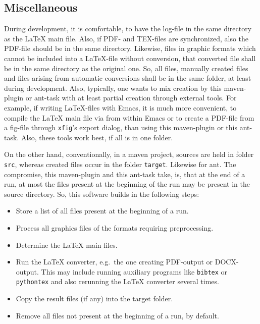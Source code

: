 \subsection{Miscellaneous}



During development, it is comfortable, 
to have the log-file in the same directory as the \LaTeX{} main file. 
Also, if PDF- and TEX-files are synchronized, 
also the PDF-file should be in the same directory. 
Likewise, files in graphic formats 
which cannot be included into a \LaTeX-file without conversion, 
that converted file shall be in the same directory as the original one. 
So, all files, manually created files 
and files arising from automatic conversions 
shall be in the same folder, at least during development. 
Also, typically, one wants to mix creation by this maven-plugin or ant-task 
with at least partial creation through external tools. 
For example, if writing \LaTeX-files with Emacs, 
it is much more convenient, to compile the \LaTeX{} main file 
via \pdflatex{} from within Emacs 
or to create a PDF-file from a \gls{fig}-file 
through \texttt{xfig}'s export dialog, 
than using this maven-plugin or this ant-task. 
Also, these tools work best, if all is in one folder. 

On the other hand, 
conventionally, in a maven project, 
sources are held in folder \texttt{src}, 
whereas created files occur in the folder \texttt{target}. 
Likewise for ant. 
The compromise, this maven-plugin and this ant-task take, 
is, that at the end of a run, 
at most the files present at the beginning of the run 
may be present in the source directory. 
So, this software builds in the following steps: 
%
\begin{itemize}
\item
Store a list of all files present at the beginning of a run.
\item
Process all graphics files of the formats requiring preprocessing.
\item
Determine the \LaTeX{} main files.
\item
Run the \LaTeX{} converter, e.g.~the one creating PDF-output or DOCX-output.
This may include running auxiliary programs like \texttt{bibtex} or \texttt{pythontex} 
and also rerunning the \LaTeX{} converter several times. 
\item
Copy the result files (if any) into the target folder.
\item
Remove all files not present at the beginning of a run, by default. 
\end{itemize}

